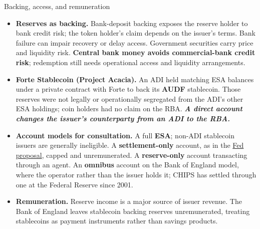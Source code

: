 \documentclass[aspectratio=169,12pt]{beamer}
\makeatletter
\newcommand{\rust}[1]{{\color{Rust}\bfseries\fontsize{\dimexpr\f@size pt+0.7pt\relax}{\f@baselineskip}\selectfont #1}}
\makeatother
\begin{document}
\iftrue %
\begin{frame}[t]{Backing, access, and remuneration}
\fontsize{8.0}{10.0}\selectfont
\vspace{-0.1em}
  \vspace{0pt plus 0.35fill}\begin{itemize}\setlength{\itemsep}{2pt plus 2.4fill}
    \item \rust{Reserves as backing.} Bank-deposit backing exposes the reserve holder to bank credit risk; the token holder's claim depends on the issuer's terms. Bank failure can impair recovery or delay access. Government securities carry price and liquidity risk. \textbf{Central bank money avoids commercial-bank credit risk}; redemption still needs operational access and liquidity arrangements.
    \item \rust{Forte Stablecoin (Project Acacia).} An ADI held matching ESA balances under a private contract with Forte to back its \textbf{AUDF} stablecoin. Those reserves were not legally or operationally segregated from the ADI's other ESA holdings; coin holders had no claim on the RBA. \textbf{\textit{A direct account changes the issuer's counterparty from an ADI to the RBA.}}
    \item \rust{Account models for consultation.} A full \textbf{ESA}; non-ADI stablecoin issuers are generally ineligible. A \textbf{settlement-only} account, as in the \href{https://www.federalreserve.gov/newsevents/pressreleases/other20260520a.htm}{Fed proposal}, capped and unremunerated. A \textbf{reserve-only} account transacting through an agent. An \textbf{omnibus} account on the Bank of England model, where the operator rather than the issuer holds it; CHIPS has settled through one at the Federal Reserve since 2001.
    \item \rust{Remuneration.} Reserve income is a major source of issuer revenue. The Bank of England leaves stablecoin backing reserves unremunerated, treating stablecoins as payment instruments rather than savings products.
  \end{itemize}\vspace{0pt plus 4fill}
\end{frame}
\fi
\end{document}
